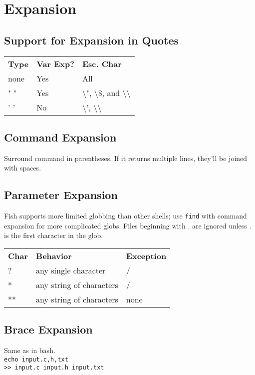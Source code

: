 \documentclass[10pt]{extarticle}
\begin{document}
\begin{paracol}{2}
\begin{tabularx}{\columnwidth}{X X}
\end{tabularx}

\section*{Expansion}

\subsection*{Support for Expansion in Quotes}

\begin{tabularx}{\columnwidth}{X X X}
    \rowcolor{DarkBackground}
    \textbf{Type} & \textbf{Var Exp?} & \textbf{Esc. Char} \\
    none & Yes & All \\
    " " & Yes & \textbackslash", \textbackslash\$, and \textbackslash\textbackslash \\
    ' ' & No & \textbackslash', \textbackslash\textbackslash
\end{tabularx}

\subsection*{Command Expansion}
Surround command in parentheses. If it returns multiple lines, they'll be joined
with spaces.

\subsection*{Parameter Expansion}
Fish supports more limited globbing than other shells; use \texttt{find} with
command expansion for more complicated globs. Files beginning with . are ignored
unless . is the first character in the glob.

\begin{tabularx}{\columnwidth}{X X X}
    \rowcolor{DarkBackground}
    \textbf{Char} & \textbf{Behavior} & \textbf{Exception} \\
    ? & any single character & / \\
    * & any string of characters & / \\
    ** & any string of characters & none
\end{tabularx}

\subsection*{Brace Expansion}
Same as in bash.\\
\texttt{echo input.{c,h,txt}}\\
\texttt{>> input.c input.h input.txt}


\end{paracol}
\end{document}
